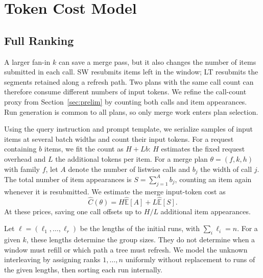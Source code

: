 \section{Token Cost Model}
\label{sec:cost}

\subsection{Full Ranking}
\label{sec:cost-full}

A larger fan-in $k$ can save a merge pass, but it also changes the number of items submitted in each call. SW resubmits items left in the window; LT resubmits the segments retained along a refresh path. Two plans with the same call count can therefore consume different numbers of input tokens. We refine the call-count proxy from Section~\ref{sec:prelim} by counting both calls and item appearances. Run generation is common to all plans, so only merge work enters plan selection.

Using the query instruction and prompt template, we serialize samples of input items at several batch widths and count their input tokens. For a request containing $b$ items, we fit the count as $H+Lb$: $H$ estimates the fixed request overhead and $L$ the additional tokens per item. For a merge plan $\theta=(f,k,h)$ with family $f$, let $A$ denote the number of listwise calls and $b_j$ the width of call $j$. The total number of item appearances is $S=\sum_{j=1}^{A}b_j$, counting an item again whenever it is resubmitted. We estimate the merge input-token cost as
\begin{equation}
  \widehat C(\theta)=H\widehat{\mathbb E}[A]+L\widehat{\mathbb E}[S].
  \label{eq:merge-cost-model}
\end{equation}
At these prices, saving one call offsets up to $H/L$ additional item appearances.

Let $\boldsymbol{\ell}=(\ell_1,\ldots,\ell_r)$ be the lengths of the initial runs, with $\sum_i\ell_i=n$. For a given $k$, these lengths determine the group sizes. They do not determine when a window must refill or which path a tree must refresh. We model the unknown interleaving by assigning ranks $1,\ldots,n$ uniformly without replacement to runs of the given lengths, then sorting each run internally.

